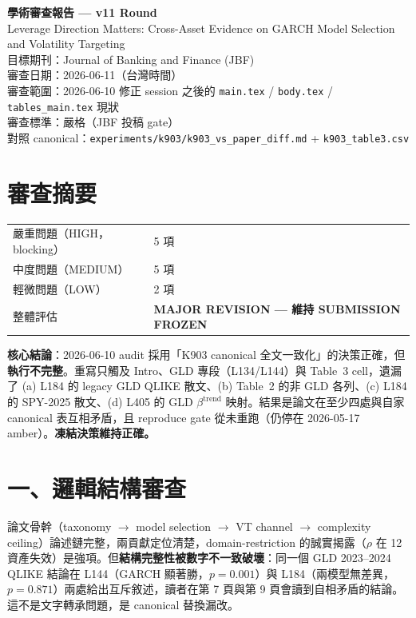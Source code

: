 \documentclass[11pt,a4paper]{article}
\begin{document}
\begin{center}
{\Large\bfseries 學術審查報告 — v11 Round}\\[0.4em]
{\large Leverage Direction Matters: Cross-Asset Evidence on GARCH Model Selection and Volatility Targeting}\\[0.4em]
{\normalsize 目標期刊：Journal of Banking and Finance (JBF)}\\
{\normalsize 審查日期：2026-06-11（台灣時間）}\\
{\normalsize 審查範圍：2026-06-10 修正 session 之後的 \texttt{main.tex} / \texttt{body.tex} / \texttt{tables\_main.tex} 現狀}\\
{\normalsize 審查標準：嚴格（JBF 投稿 gate）}\\
{\normalsize 對照 canonical：\texttt{experiments/k903/k903\_vs\_paper\_diff.md} + \texttt{k903\_table3.csv}}
\end{center}

\section*{審查摘要}

\begin{tabular}{ll}
\textcolor{errorred}{嚴重問題（HIGH，blocking）} & 5 項 \\
\textcolor{warncolor}{中度問題（MEDIUM）} & 5 項 \\
輕微問題（LOW） & 2 項 \\
整體評估 & \textcolor{errorred}{\textbf{MAJOR REVISION — 維持 SUBMISSION FROZEN}} \\
\end{tabular}

\medskip
\noindent\textbf{核心結論}：2026-06-10 audit 採用「K903 canonical 全文一致化」的決策正確，但\textbf{執行不完整}。重寫只觸及 Intro、GLD 專段（L134/L144）與 Table~3 cell，遺漏了 (a) L184 的 legacy GLD QLIKE 散文、(b) Table~2 的非 GLD 各列、(c) L184 的 SPY-2025 散文、(d) L405 的 GLD $\beta^{\text{trend}}$ 映射。結果是論文在至少四處與自家 canonical 表互相矛盾，且 reproduce gate 從未重跑（仍停在 2026-05-17 amber）。\textbf{凍結決策維持正確。}

\section{一、邏輯結構審查}

論文骨幹（taxonomy $\to$ model selection $\to$ VT channel $\to$ complexity ceiling）論述鏈完整，兩貢獻定位清楚，domain-restriction 的誠實揭露（$\rho$ 在 12 資產失效）是強項。但\textbf{結構完整性被數字不一致破壞}：同一個 GLD 2023--2024 QLIKE 結論在 L144（GARCH 顯著勝，$p=0.001$）與 L184（兩模型無差異，$p=0.871$）兩處給出互斥敘述，讀者在第 7 頁與第 9 頁會讀到自相矛盾的結論。這不是文字轉承問題，是 canonical 替換漏改。
\end{document}
